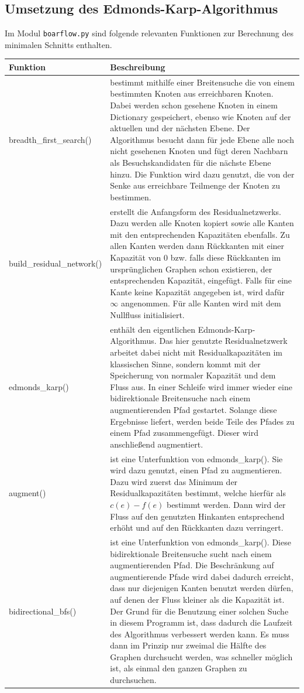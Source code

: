 \documentclass[a4paper, notitlepage, 12pt]{scrartcl}
\begin{document}
 \subsection{Umsetzung des Edmonds-Karp-Algorithmus}
 Im Modul \texttt{boarflow.py} sind folgende relevanten Funktionen zur Berechnung des minimalen Schnitts enthalten.
 \begin{longtabu} to \linewidth {lX}
 Funktion & Beschreibung \\ \hline \hline \endhead
 breadth\_first\_search() & bestimmt mithilfe einer Breitensuche die von einem bestimmten Knoten aus erreichbaren Knoten. Dabei werden schon gesehene Knoten in einem Dictionary gespeichert, ebenso wie Knoten auf der aktuellen und der nächsten Ebene. Der Algorithmus besucht dann für jede Ebene alle noch nicht gesehenen Knoten und fügt deren Nachbarn als Besuchskandidaten für die nächste Ebene hinzu. Die Funktion wird dazu genutzt, die von der Senke aus erreichbare Teilmenge der Knoten zu bestimmen.\\ \hline
 build\_residual\_network() & erstellt die Anfangsform des Residualnetzwerks. Dazu werden alle Knoten kopiert sowie alle Kanten mit den entsprechenden Kapazitäten ebenfalls. Zu allen Kanten werden dann Rückkanten mit einer Kapazität von 0 bzw. falls diese Rückkanten im ursprünglichen Graphen schon existieren, der entsprechenden Kapazität, eingefügt. Falls für eine Kante keine Kapazität angegeben ist, wird dafür $\infty$ angenommen. Für alle Kanten wird mit dem Nullfluss initialisiert. \\ \hline
 edmonds\_karp() & enthält den eigentlichen Edmonds-Karp-Algorithmus. Das hier genutzte Residualnetzwerk arbeitet dabei nicht mit Residualkapazitäten im klassischen Sinne, sondern kommt mit der Speicherung von normaler Kapazität und dem Fluss aus. In einer Schleife wird immer wieder eine bidirektionale Breitensuche nach einem augmentierenden Pfad gestartet. Solange diese Ergebnisse liefert, werden beide Teile des Pfades zu einem Pfad zusammengefügt. Dieser wird anschließend augmentiert.\\ \hline
 augment() & ist eine Unterfunktion von edmonds\_karp(). Sie wird dazu genutzt, einen Pfad zu augmentieren. Dazu wird zuerst das Minimum der Residualkapazitäten bestimmt, welche hierfür als $c(e) -f(e)$ bestimmt werden. Dann wird der Fluss auf den genutzten Hinkanten entsprechend erhöht und auf den Rückkanten dazu verringert. \\ \hline
 bidirectional\_bfs() & ist eine Unterfunktion von edmonds\_karp(). Diese bidirektionale Breitensuche sucht nach einem augmentierenden Pfad. Die Beschränkung auf augmentierende Pfade wird dabei dadurch erreicht, dass nur diejenigen Kanten benutzt werden  dürfen, auf denen der Fluss kleiner als die Kapazität ist. Der Grund für die Benutzung einer solchen Suche in diesem Programm ist, dass dadurch die Laufzeit des Algorithmus verbessert werden kann. Es muss dann im Prinzip nur zweimal die Hälfte des Graphen durchsucht werden, was schneller möglich ist, als einmal den ganzen Graphen zu durchsuchen.\\ \hline

\end{longtabu}
\end{document}
